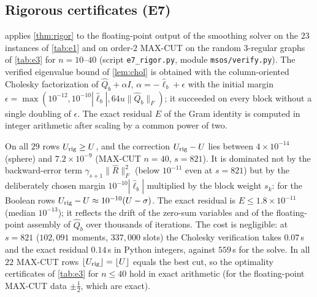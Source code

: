 \documentclass[a4paper,11pt]{article}
\newcommand{\fitbox}[1]{\sbox{\tabbox}{#1}\ifdim\wd\tabbox>\textwidth\resizebox{\textwidth}{!}{\usebox{\tabbox}}\else\usebox{\tabbox}\fi}
\theoremstyle{plain}
\theoremstyle{definition}
\theoremstyle{remark}
\begin{document}
\subsection{Rigorous certificates (E7)}\label{sec:e7}
 applies \cref{thm:rigor} to the floating-point output of the smoothing solver on the $23$ instances of \cref{tab:e1} and on order-$2$ MAX-CUT on the random $3$-regular graphs of \cref{tab:e3} for $n=10$--$40$ (script \texttt{e7\_rigor.py}, module \texttt{msos/verify.py}). The verified eigenvalue bound of \cref{lem:chol} is obtained with the column-oriented Cholesky factorization of $\hat Q_b+\alpha I$, $\alpha=-\hat\ell_b+\epsilon$ with the initial margin $\epsilon=\max(10^{-12},10^{-10}|\hat\ell_b|,64u\|\hat Q_b\|_F)$; it succeeded on every block without a single doubling of $\epsilon$. The exact residual $E$ of the Gram identity is computed in integer arithmetic after scaling by a common power of two.
\begin{table}[t]\centering\scriptsize
\setlength{\tabcolsep}{3pt}
\fitbox{}
\caption{Rigorous a posteriori certificates (\cref{thm:rigor}). $U$ is the floating-point certificate, $U_{\rm rig}-U$ the rigorous correction, $E$ the exact residual of \eqref{eq:identity}, ``max eig.\ slack'' the largest $\hat\ell_b-\ell_b$ over the blocks, $t_{\rm chol}$ and $t_{\rm res}$ the times of the Cholesky verification and of the exact residual. For MAX-CUT, ``certified'' means $\lfloor U_{\rm rig}\rfloor=\lfloor U\rfloor=$ best cut.}\label{tab:e7}
\end{table}
On all $29$ rows $U_{\rm rig}\ge U$, and the correction $U_{\rm rig}-U$ lies between $4\times10^{-14}$ (sphere) and $7.2\times10^{-9}$ (MAX-CUT $n=40$, $s=821$). It is dominated not by the backward-error term $\gamma_{s+1}\|\hat R\|_F^2$ (below $10^{-11}$ even at $s=821$) but by the deliberately chosen margin $10^{-10}|\hat\ell_b|$ multiplied by the block weight $s_k$: for the Boolean rows $U_{\rm rig}-U\approx10^{-10}(U-\sigma)$. The exact residual is $E\le1.8\times10^{-11}$ (median $10^{-13}$); it reflects the drift of the zero-sum variables and of the floating-point assembly of $\hat Q_b$ over thousands of iterations. The cost is negligible: at $s=821$ ($102{,}091$ moments, $337{,}000$ slots) the Cholesky verification takes $0.07$\,s and the exact residual $0.14$\,s in Python integers, against $559$\,s for the solve. In all $22$ MAX-CUT rows $\lfloor U_{\rm rig}\rfloor=\lfloor U\rfloor$ equals the best cut, so the optimality certificates of \cref{tab:e3} for $n\le40$ hold in exact arithmetic (for the floating-point MAX-CUT data $\pm\tfrac12$, which are exact).
\end{document}
